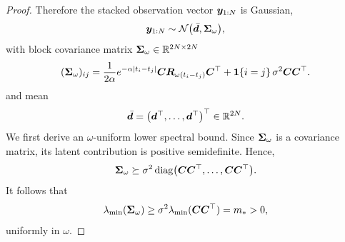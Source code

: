 \begin{proof}
Therefore the stacked observation vector $\boldsymbol{y}_{1:N}$ is Gaussian,
\begin{equation*}
    \boldsymbol{y}_{1:N}
    \sim
    \mathcal{N}\big(\bar{\boldsymbol{d}},\boldsymbol{\Sigma}_\omega\big),
\end{equation*}
with block covariance matrix $\boldsymbol{\Sigma}_\omega \in \mathbb{R}^{2N \times 2N}$
\begin{equation*}
    (\boldsymbol{\Sigma}_\omega)_{ij}
    =
    \frac{1}{2\alpha}
    e^{-\alpha |t_i-t_j|}
    \boldsymbol{C} \boldsymbol{R}_{\omega(t_i-t_j)} \boldsymbol{C}^\top
    +
    \mathbf{1}\{i=j\}\,\sigma^2 \boldsymbol{C} \boldsymbol{C}^\top.
\end{equation*}
and mean
\begin{equation*}
    \bar{\boldsymbol{d}}
    = \big(
        \boldsymbol{d}^\top,
        \ldots,
        \boldsymbol{d}^\top
    \big)^\top
    \in \mathbb{R}^{2N}.
\end{equation*}
We first derive an $\omega$-uniform lower spectral bound. Since $\boldsymbol{\Sigma}_\omega$ is a covariance matrix, its latent contribution is positive semidefinite. Hence,
\begin{equation*}
    \boldsymbol{\Sigma}_\omega
    \succeq
    \sigma^2 \,
    \mathrm{diag}\big(
        \boldsymbol{C}\boldsymbol{C}^\top,
        \ldots,
        \boldsymbol{C}\boldsymbol{C}^\top
    \big).
\end{equation*}
It follows that
\begin{equation*}
    \lambda_{\min}(\boldsymbol{\Sigma}_\omega)
    \geq
    \sigma^2 \lambda_{\min}(\boldsymbol{C}\boldsymbol{C}^\top)
    =
    m_* > 0,
\end{equation*}
uniformly in $\omega$.


\end{proof}
